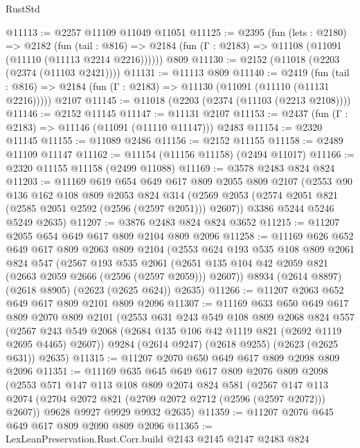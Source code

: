 \begin{lexlean}{RustStd}
\begin{coremodule}
@11113 := @2257 @11109 @11049 @11051
@11125 := @2395
    (fun (lets : @2180) =>
    @2182
      (fun (tail : @816) =>
      @2184 (fun (Γ : @2183) => @11108 (@11091 (@11110 (@11113 @2214 @2216))))))
    @809
@11130 := @2152 (@11018 (@2203 (@2374 (@11103 @2421))))
@11131 := @11113 @809
@11140 := @2419
    (fun (tail : @816) => @2184 (fun (Γ : @2183) => @11130 (@11091 (@11110 (@11131 @2216)))))
    @2107
@11145 := @11018 (@2203 (@2374 (@11103 (@2213 @2108))))
@11146 := @2152 @11145
@11147 := @11131 @2107
@11153 := @2437 (fun (Γ : @2183) => @11146 (@11091 (@11110 @11147))) @2483
@11154 := @2320 @11145
@11155 := @11089 @2486
@11156 := @2152 @11155
@11158 := @2489 @11109 @11147
@11162 := @11154 (@11156 @11158) (@2494 @11017)
@11166 := @2320 @11155 @11158 (@2499 @11088)
@11169 := @3578 @2483 @824 @824
@11203 := @11169
    @619
    @654
    @649
    @617
    @809
    @2055
    @809
    @2107
    (@2553
      @90
      @136
      @162
      @108
      @809
      @2053
      @824
      @314
      (@2569 @2053 (@2574 @2051 @821 (@2585 @2051 @2592 (@2596 (@2597 @2051))) @2607))
      @3386
      @5244
      @5246
      @5249
      @2635)
@11207 := @3876 @2483 @824 @824 @3652
@11215 := @11207 @2055 @654 @649 @617 @809 @2104 @809 @2096
@11258 := @11169
    @626
    @652
    @649
    @617
    @809
    @2063
    @809
    @2104
    (@2553
      @624
      @193
      @535
      @108
      @809
      @2061
      @824
      @547
      (@2567
        @193
        @535
        @2061
        (@2651 @135 @104 @42 @2059 @821 (@2663 @2059 @2666 (@2596 (@2597 @2059))) @2607))
      @8934
      (@2614 @8897)
      (@2618 @8905)
      (@2623 (@2625 @624))
      @2635)
@11266 := @11207 @2063 @652 @649 @617 @809 @2101 @809 @2096
@11307 := @11169
    @633
    @650
    @649
    @617
    @809
    @2070
    @809
    @2101
    (@2553
      @631
      @243
      @549
      @108
      @809
      @2068
      @824
      @557
      (@2567 @243 @549 @2068 (@2684 @135 @106 @42 @1119 @821 (@2692 @1119 @2695 @4465) @2607))
      @9284
      (@2614 @9247)
      (@2618 @9255)
      (@2623 (@2625 @631))
      @2635)
@11315 := @11207 @2070 @650 @649 @617 @809 @2098 @809 @2096
@11351 := @11169
    @635
    @645
    @649
    @617
    @809
    @2076
    @809
    @2098
    (@2553
      @571
      @147
      @113
      @108
      @809
      @2074
      @824
      @581
      (@2567 @147 @113 @2074 (@2704 @2072 @821 (@2709 @2072 @2712 (@2596 (@2597 @2072))) @2607))
      @9628
      @9927
      @9929
      @9932
      @2635)
@11359 := @11207 @2076 @645 @649 @617 @809 @2090 @809 @2096
@11365 := LexLeanPreservation.Rust.Corr.build @2143 @2145 @2147 @2483 @824

\end{coremodule}
\end{lexlean}
